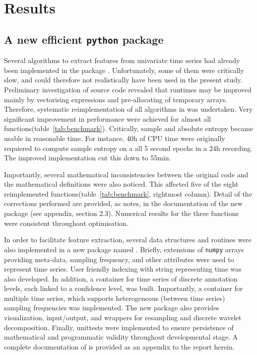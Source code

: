 
\section{Results} \label{results}

\subsection{A new efficient \texttt{python} package}
Several algorithms to extract features from univariate time series had already been implemented in the \py{} package \pyeeg{}\citationneeded{}.
Unfortunately, some of them were critically slow, and could therefore not realistically have been used in the present study.
Preliminary investigation of \pyeeg{} source code revealed that runtimes may be improved mainly by vectorising expressions and pre-allocating of temporary arrays.
Therefore, systematic reimplementation of all algorithms in \pyeeg{} was undertaken.
Very significant improvement in performance were achieved for almost all functions(table~\ref{tab:benchmark}).
Critically, sample \citationneeded{} and absolute \citationneeded{} entropy became usable in reasonable time.
For instance, 40h of CPU time were originally  requiered to compute sample entropy on a all 5 second epochs in a 24h recording.
The improved implementation cut this down to 55min.


Importantly, several mathematical inconsistencies between the original code and the mathematical definitions were also noticed.
This affected five of the eight reimplemented functions(table~\ref{tab:benchmark}, rightmost column).
Detail of the corrections performed are provided, as notes, in the documentation of the new package (see appendix, section 2.3).
Numerical results for the three  functions were consistent throughout optimisation.

In order to facilitate feature extraction, several data structures and routines were also implemented
in a new \py{} package named \pr{}.
Briefly, extensions of \texttt{numpy} arrays providing meta-data, sampling frequency, and other attributes were used to represent time series.
User friendly indexing with string representing time was also developed.
In addition, a container for time series of discrete annotation levels, each linked to a confidence level, was built.
Importantly, a container for multiple time series, which supports heterogeneous (between time series) sampling frequencies was implemented.
The new package also provides visualization, input/output, and wrappers for resampling and discrete wavelet decomposition.
Finally, unittests were implemented to ensure persistence of mathematical and programmatic validity throughout developmental stage.
A complete documentation of \pr{} is provided as an appendix to the report herein.

